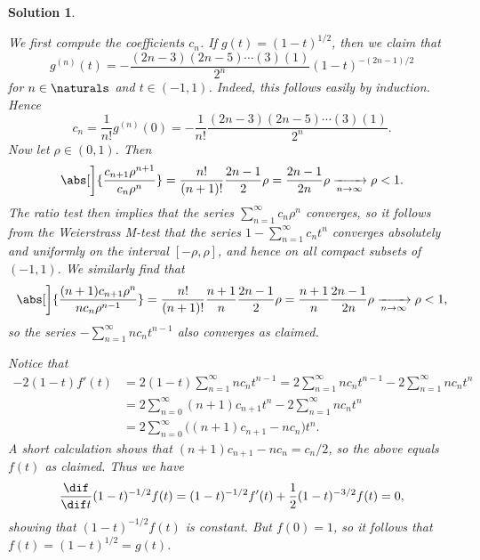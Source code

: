 \documentclass[article, a4paper, 11pt, oneside]{memoir}
\numberwithin{equation}{chapter}
\theoremstyle{nonumberplain}
\newtheorem{solution}{Solution}
\begin{document}
\begin{solution}
\begin{solutionsec}
	\item We first compute the coefficients $c_n$. If $g(t) = (1 - t)^{1/2}$, then we claim that
	\begin{equation*}
		g^{(n)}(t)
			= - \frac{(2n-3)(2n-5) \cdots (3)(1)}{2^n} (1-t)^{-(2n-1)/2}
	\end{equation*}
	for $n \in \naturals$ and $t \in (-1,1)$. Indeed, this follows easily by induction. Hence
	\begin{equation*}
		c_n
			= \frac{1}{n!} g^{(n)}(0)
			= - \frac{1}{n!} \frac{(2n-3)(2n-5) \cdots (3)(1)}{2^n}.
	\end{equation*}
	Now let $\rho \in (0,1)$. Then
	\begin{equation*}
		\abs[\bigg]{\frac{c_{n+1}\rho^{n+1}}{c_n \rho^n}}
			= \frac{n!}{(n+1)!} \frac{2n-1}{2} \rho
			= \frac{2n-1}{2n} \rho
			\xrightarrow[n \to \infty]{} \rho
			< 1.
	\end{equation*}
	The ratio test then implies that the series $\sum_{n=1}^\infty c_n \rho^n$ converges, so it follows from the Weierstrass M-test that the series $1 - \sum_{n=1}^\infty c_n t^n$ converges absolutely and uniformly on the interval $[-\rho,\rho]$, and hence on all compact subsets of $(-1,1)$. We similarly find that
	\begin{equation*}
		\abs[\bigg]{\frac{(n+1)c_{n+1}\rho^n}{nc_n \rho^{n-1}}}
			= \frac{n!}{(n+1)!} \frac{n+1}{n} \frac{2n-1}{2} \rho
			= \frac{n+1}{n} \frac{2n-1}{2n} \rho
			\xrightarrow[n \to \infty]{} \rho
			< 1,
	\end{equation*}
	so the series $- \sum_{n=1}^\infty n c_n t^{n-1}$ also converges as claimed.

	\item Notice that
	\begin{align*}
		-2(1-t) f'(t)
			&= 2(1-t) \sum_{n=1}^\infty n c_n t^{n-1}
			 = 2 \sum_{n=1}^\infty n c_n t^{n-1} - 2 \sum_{n=1}^\infty n c_n t^n \\
			&= 2 \sum_{n=0}^\infty (n+1) c_{n+1} t^n - 2 \sum_{n=1}^\infty n c_n t^n \\
			&= 2 \sum_{n=0}^\infty \bigl( (n+1) c_{n+1} - n c_n \bigr) t^n.
	\end{align*}
	A short calculation shows that $(n+1) c_{n+1} - n c_n = c_n/2$, so the above equals $f(t)$ as claimed. Thus we have
	\begin{equation*}
		\frac{\dif}{\dif t} (1-t)^{-1/2} f(t)
			= (1-t)^{-1/2} f'(t) + \frac{1}{2} (1-t)^{-3/2} f(t)
			= 0,
	\end{equation*}
	showing that $(1-t)^{-1/2} f(t)$ is constant. But $f(0) = 1$, so it follows that $f(t) = (1-t)^{1/2} = g(t)$.
\end{solutionsec}
\end{solution}
\end{document}
